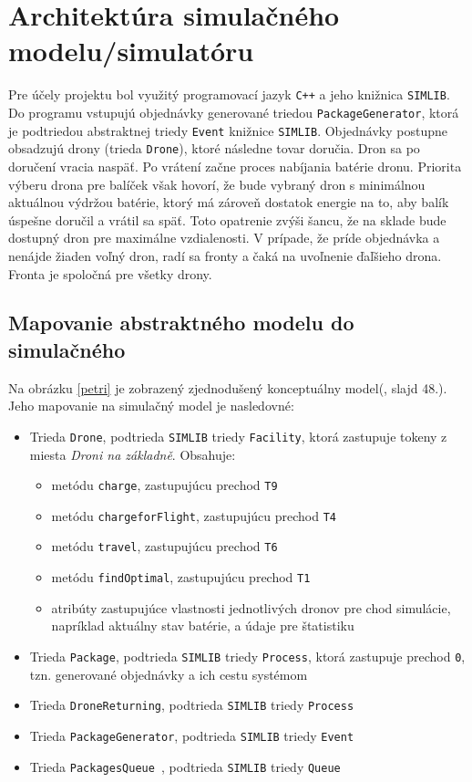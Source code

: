 \documentclass[czech, 12pt, a4paper]{article}
\begin{document}
\section{Architektúra simulačného modelu/simulatóru}\label{archi}
Pre účely projektu bol využitý programovací jazyk \texttt{C++} a jeho knižnica \texttt{SIMLIB}. 
Do programu vstupujú objednávky generované triedou \texttt{PackageGenerator}, ktorá je podtriedou abstraktnej triedy \texttt{Event} knižnice \texttt{SIMLIB}. Objednávky postupne obsadzujú drony (trieda \texttt{Drone}), ktoré následne tovar doručia. Dron sa po doručení vracia naspäť. Po vrátení začne proces nabíjania batérie dronu. Priorita výberu drona pre balíček však hovorí, že bude vybraný dron s minimálnou aktuálnou výdržou batérie, ktorý má zároveň dostatok energie na to, aby balík úspešne doručil a vrátil sa späť. Toto opatrenie zvýši šancu, že na sklade bude dostupný dron pre maximálne vzdialenosti. V prípade, že príde objednávka a nenájde žiaden voľný dron, radí sa fronty a čaká na uvoľnenie ďaľšieho drona. Fronta je spoločná pre všetky drony.

\subsection{Mapovanie abstraktného modelu do simulačného}
Na obrázku \ref{petri} je zobrazený zjednodušený konceptuálny model(\cite{prednasky}, slajd 48.). Jeho mapovanie na simulačný model je nasledovné:

\begin{itemize}
	\item Trieda \texttt{Drone}, podtrieda \texttt{SIMLIB} triedy \texttt{Facility}, ktorá zastupuje tokeny z miesta \textit{Droni na základně}. Obsahuje:
	\begin{itemize}
		\item metódu \texttt{charge}, zastupujúcu prechod \texttt{T9}
		\item metódu \texttt{chargeforFlight}, zastupujúcu prechod \texttt{T4}
		\item metódu \texttt{travel}, zastupujúcu prechod \texttt{T6}
		\item metódu \texttt{findOptimal}, zastupujúcu prechod \texttt{T1}
		\item atribúty zastupujúce vlastnosti jednotlivých dronov pre chod simulácie, napríklad aktuálny stav batérie, a údaje pre štatistiku
	\end{itemize}
	\item Trieda \texttt{Package}, podtrieda \texttt{SIMLIB} triedy \texttt{Process}, ktorá zastupuje prechod \texttt{0}, tzn. generované objednávky a ich cestu systémom
	\item Trieda \texttt{DroneReturning}, podtrieda \texttt{SIMLIB} triedy \texttt{Process}
	\item Trieda \texttt{PackageGenerator}, podtrieda \texttt{SIMLIB} triedy \texttt{Event}
	\item Trieda \texttt{PackagesQueue }, podtrieda \texttt{SIMLIB} triedy \texttt{Queue}
\end{itemize}
\end{document}
